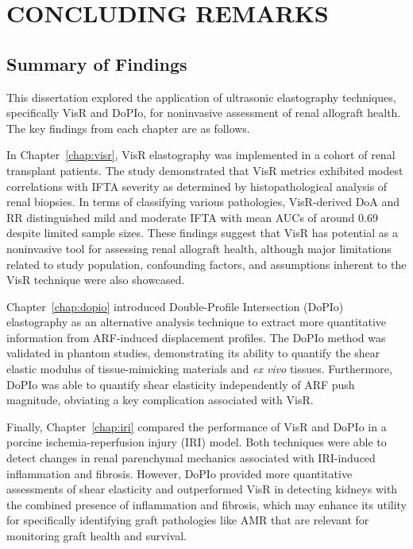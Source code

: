 
\chapter{CONCLUDING REMARKS}
\label{chap:conclusion}

\section{Summary of Findings}

This dissertation explored the application of ultrasonic elastography techniques, specifically VisR and DoPIo, for noninvasive assessment of renal allograft health. The key findings from each chapter are as follows.


In Chapter~\ref{chap:visr}, VisR elastography was implemented in a cohort of renal transplant patients. The study demonstrated that VisR metrics exhibited modest correlations with IFTA severity as determined by histopathological analysis of renal biopsies. In terms of classifying various pathologies, VisR-derived DoA and RR distinguished mild and moderate IFTA with mean AUCs of around 0.69 despite limited sample sizes. These findings suggest that VisR has potential as a noninvasive tool for assessing renal allograft health, although major limitations related to study population, confounding factors, and assumptions inherent to the VisR technique were also showcased.


Chapter~\ref{chap:dopio} introduced Double-Profile Intersection (DoPIo) elastography as an alternative analysis technique to extract more quantitative information from ARF-induced displacement profiles. The DoPIo method was validated in phantom studies, demonstrating its ability to quantify the shear elastic modulus of tissue-mimicking materials and \emph{ex vivo} tissues. Furthermore, DoPIo was able to quantify shear elasticity independently of ARF push magnitude, obviating a key complication associated with VisR.


Finally, Chapter~\ref{chap:iri} compared the performance of VisR and DoPIo in a porcine ischemia-reperfusion injury (IRI) model. Both techniques were able to detect changes in renal parenchymal mechanics associated with IRI-induced inflammation and fibrosis. However, DoPIo provided more quantitative assessments of shear elasticity and outperformed VisR in detecting kidneys with the combined presence of inflammation and fibrosis, which may enhance its utility for specifically identifying graft pathologies like AMR that are relevant for monitoring graft health and survival.

